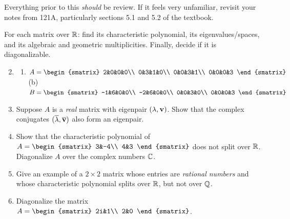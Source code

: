 Everything prior to this \emph{should} be review. If it feels very unfamiliar, revisit your notes from 121A, particularly sections 5.1 and 5.2 of the textbook.



\begin{exercises}
	\exstart For each matrix over $\mathbb{R}$: find its characteristic polynomial, its eigenvalues/spaces, and its algebraic and geometric multiplicities. Finally, decide if it is diagonalizable.
	\begin{enumerate}\setcounter{enumi}{1}
  	\item[]\begin{enumerate}
    	\item $A=
    	\begin{smatrix}
	  		2&0&0&0\\
	  		0&3&1&0\\
	  		0&0&3&1\\
	  		0&0&0&3
  		\end{smatrix}$\qquad\quad
  		(b)\ \  $B=
  		\begin{smatrix}
	  		-1&6&0&0\\
	  		-2&6&0&0\\
	  		0&0&3&0\\
	  		0&0&0&3
  		\end{smatrix}$
  	\end{enumerate}
  	
  	
	 	\item Suppose $A$ is a \emph{real} matrix with eigenpair $(\lambda,{\mathbf{v}})$. Show that the complex conjugates $(\overline{\lambda},\overline{{\mathbf{v}}})$ also form an eigenpair.
	  
	  
	  \item Show that the characteristic polynomial of $A=
	  \begin{smatrix}
	  	3&-4\\
	  	4&3
	  \end{smatrix}$
	  does not split over $\mathbb{R}$. Diagonalize $A$ over the complex numbers $\mathbb{C}$.
	  
	  
	  \item Give an example of a $2\times 2$ matrix whose entries are \emph{rational numbers} and whose characteristic polynomial splits over $\mathbb{R}$, but not over $\mathbb{Q}$.
	  
	  
	  \item Diagonalize the matrix $A=
	  \begin{smatrix}
	  	2i&1\\
	  	2&0
	  \end{smatrix}$.
	  

\end{enumerate}
\end{exercises}
